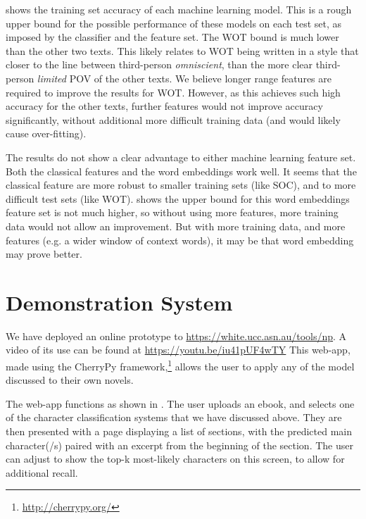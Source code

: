 \documentclass[11pt,a4paper]{article}
\begin{document}
 shows the training set accuracy of each machine learning model.
This is a rough upper bound for the possible performance of these models on each test set, as imposed by the classifier and the feature set.
The WOT bound is much lower than the other two texts.
This likely relates to WOT being written in a style that closer to the line between third-person \emph{omniscient}, than the more clear third-person \emph{limited} POV of the other texts.
We believe longer range features are required to improve the results for WOT.
However, as this achieves such high accuracy for the other texts, further features would not improve accuracy significantly, without additional more difficult training data (and would likely cause over-fitting).

%
%
The results do not show a clear advantage to either machine learning feature set.
Both the classical features and the word embeddings work well.
It seems that the classical feature are more robust to smaller training sets (like SOC), and to more difficult test sets (like WOT).
 shows the upper bound for this word embeddings feature set is not much higher, so without using more features, more training data would not allow an improvement.
But with more training data, and more features (e.g. a wider window of context words), it may be that word embedding may prove better.

\section{Demonstration System}\label{sec:demonstration}
We have deployed an online prototype to \url{https://white.ucc.asn.au/tools/np}.
A video of its use can be found at \url{https://youtu.be/iu41pUF4wTY}
This web-app, made using the CherryPy framework,\footnote{\url{http://cherrypy.org/}}
allows the user to apply any of the model discussed to their own novels.

The web-app functions as shown in .
The user uploads an ebook, and selects one of the character classification systems that we have discussed above.
They are then presented with a page displaying a list of sections,
with the predicted main character(/s) paired with an excerpt from the beginning of the section.
The user can adjust to show the top-k most-likely characters on this screen, to allow for additional recall.
\end{document}
